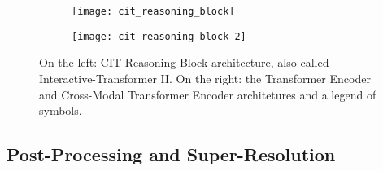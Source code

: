 \FloatBarrier
\begin{figure}
\centering
\begin{subfigure}{0.7\linewidth}
  \centering
  \texttt{[image: cit\_reasoning\_block]}
  \label{fig:sub1}
\end{subfigure}%
\begin{subfigure}{0.3\linewidth}
  \centering
  \texttt{[image: cit\_reasoning\_block\_2]}
  \label{fig:sub2}
\end{subfigure}
\caption{On the left: CIT Reasoning Block architecture, also called Interactive-Transformer II. On the right: the Transformer Encoder and Cross-Modal Transformer Encoder architetures and a legend of symbols.}
\label{fig:cit_architecture}
\end{figure}
\FloatBarrier


\subsection{Post-Processing and Super-Resolution}

